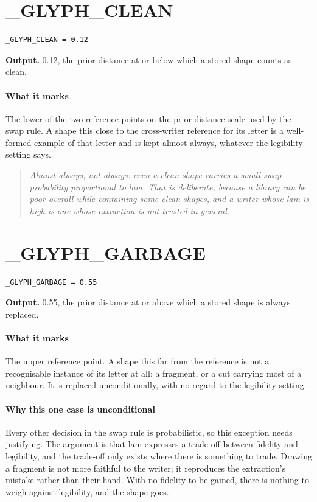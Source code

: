 \section{\_GLYPH\_CLEAN}
\begin{lstlisting}[style=sig]
_GLYPH_CLEAN = 0.12
\end{lstlisting}

\noindent\textbf{Output.} 0.12, the prior distance at or below which a stored shape counts as clean.


\paragraph{What it marks}
The lower of the two reference points on the prior-distance scale used by the swap rule. A shape this close to the cross-writer reference for its letter is a well-formed example of that letter and is kept almost always, whatever the legibility setting says.


\begin{quote}\small\itshape Almost always, not always: even a clean shape carries a small swap probability proportional to lam. That is deliberate, because a library can be poor overall while containing some clean shapes, and a writer whose lam is high is one whose extraction is not trusted in general.\end{quote}

\section{\_GLYPH\_GARBAGE}
\begin{lstlisting}[style=sig]
_GLYPH_GARBAGE = 0.55
\end{lstlisting}

\noindent\textbf{Output.} 0.55, the prior distance at or above which a stored shape is always replaced.


\paragraph{What it marks}
The upper reference point. A shape this far from the reference is not a recognisable instance of its letter at all: a fragment, or a cut carrying most of a neighbour. It is replaced unconditionally, with no regard to the legibility setting.


\paragraph{Why this one case is unconditional}
Every other decision in the swap rule is probabilistic, so this exception needs justifying. The argument is that lam expresses a trade-off between fidelity and legibility, and the trade-off only exists where there is something to trade. Drawing a fragment is not more faithful to the writer; it reproduces the extraction's mistake rather than their hand. With no fidelity to be gained, there is nothing to weigh against legibility, and the shape goes.



